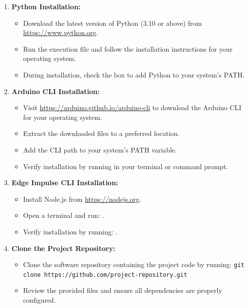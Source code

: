 \begin{enumerate}
	\item \textbf{Python Installation:}
	\begin{itemize}
		\item Download the latest version of Python (3.10 or above) from \href{https://www.python.org}{https://www.python.org}.
		\item Run the execution file and follow the installation instructions for your operating system.
		\item During installation, check the box to add Python to your system's PATH.
	\end{itemize}
	
	\item \textbf{Arduino CLI Installation:}
	\begin{itemize}
		\item Visit \href{https://arduino.github.io/arduino-cli}{https://arduino.github.io/arduino-cli} to download the Arduino CLI for your operating system.
		\item Extract the downloaded files to a preferred location.
		\item Add the CLI path to your system's PATH variable.
		\item Verify installation by running  in your terminal or command prompt.
	\end{itemize}
	
	\item \textbf{Edge Impulse CLI Installation:}
	\begin{itemize}
		\item Install Node.js from \href{https://nodejs.org}{https://nodejs.org}.
		\item Open a terminal and run: .
		\item Verify installation by running: .
	\end{itemize}
	
	\item \textbf{Clone the Project Repository:}
	\begin{itemize}
		\item Clone the software repository containing the project code by running:  
		\texttt{git clone https://github.com/project-repository.git}
		\item Review the provided files and ensure all dependencies are properly configured.
	\end{itemize}
\end{enumerate}


